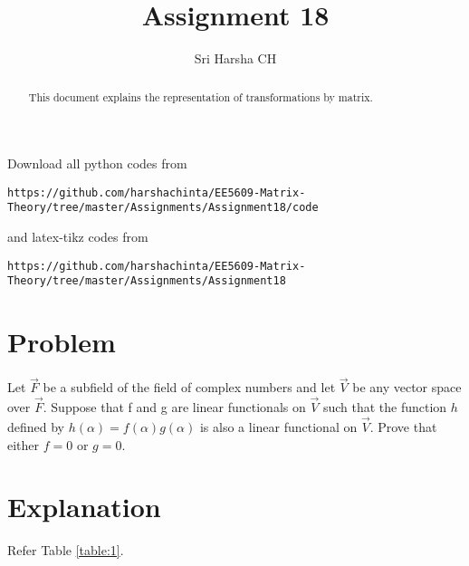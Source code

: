 \documentclass[journal,12pt,twocolumn]{IEEEtran}
\begin{document}
\renewcommand{\thefigure}{\theproblem}

\def\putbox#1#2#3{\makebox[0in][l]{\makebox[#1][l]{}\raisebox{\baselineskip}[0in][0in]{\raisebox{#2}[0in][0in]{#3}}}}
     \def\rightbox#1{\makebox[0in][r]{#1}}
     \def\centbox#1{\makebox[0in]{#1}}
     \def\topbox#1{\raisebox{-\baselineskip}[0in][0in]{#1}}
     \def\midbox#1{\raisebox{-0.5\baselineskip}[0in][0in]{#1}}
\vspace{3cm}
\title{Assignment 18}
\author{Sri Harsha CH}

\maketitle
\newpage

\bigskip
\renewcommand{\thefigure}{\theenumi}
\renewcommand{\thetable}{\theenumi}

\begin{abstract}
This document explains the representation of transformations by matrix.
\end{abstract}

Download all python codes from 
\begin{lstlisting}
https://github.com/harshachinta/EE5609-Matrix-Theory/tree/master/Assignments/Assignment18/code
\end{lstlisting}
%
and latex-tikz codes from 
%
\begin{lstlisting}
https://github.com/harshachinta/EE5609-Matrix-Theory/tree/master/Assignments/Assignment18
\end{lstlisting}
%
\section{Problem}
Let $\vec{F}$ be a subfield of the field of complex numbers and let $\vec{V}$ be any vector space over $\vec{F}$. Suppose that f and g are linear functionals on $\vec{V}$ such that the function $h$ defined by $h(\alpha) =f(\alpha) g(\alpha)$ is also a linear functional on $\vec{V}$. Prove that either $f=0$ or $g=0$.

\section{Explanation}
Refer Table \ref{table:1}.
\end{document}
